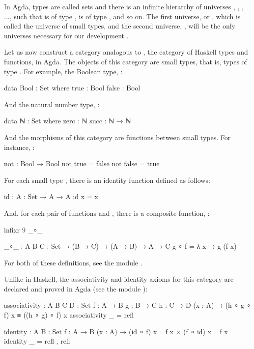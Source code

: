 In Agda, types are called sets and there is an infinite hierarchy of
universes , , , ..., such
that  is of type ,  is of
type , and so on. The first universe, 
or , which is called the universe of small types, and
the second universe, , will be the only universes
necessary for our development \parencites[57,
  61]{bove-dybjer-2009}[231]{norell-2009}.

Let us now construct a category analogous to \hask, the category of
Haskell types and functions, in Agda. The objects of this category are
small types, that is, types of type . For example, the
Boolean type, :
\begin{codeagda}
data Bool : Set where
  true  : Bool
  false : Bool
\end{codeagda}
And the natural number type, :
\begin{codeagda}
data ℕ : Set where
  zero : ℕ
  succ : ℕ → ℕ
\end{codeagda}
And the morphisms of this category are functions between small types.
For instance, :
\begin{codeagda}
not : Bool → Bool
not true  = false
not false = true
\end{codeagda}

For each small type , there is an identity function
defined as follows:
\begin{codeagda}
id : {A : Set} → A → A
id x = x
\end{codeagda}
And, for each pair of functions  and , there is a composite function, :
\begin{codeagda}
infixr 9 _∘_

_∘_ : {A B C : Set} → (B → C) → (A → B) → A → C
g ∘ f = λ x → g (f x)
\end{codeagda}
For both of these definitions, see the module .

Unlike in Haskell, the associativity and identity axioms for this
category are declared and proved in Agda (see the module
):
\begin{codeagda}
associativity : {A B C D : Set} {f : A → B} {g : B → C} {h : C → D}
                (x : A) → (h ∘ g ∘ f) x ≡ ((h ∘ g) ∘ f) x
associativity _ = refl

identity : {A B : Set} {f : A → B}
           (x : A) → (id ∘ f) x ≡ f x × (f ∘ id) x ≡ f x
identity _ = refl , refl
\end{codeagda}

